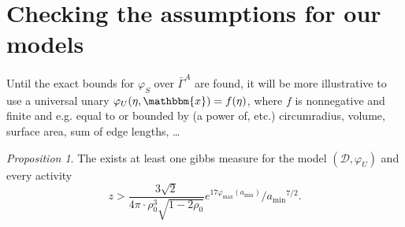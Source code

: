 \documentclass[12pt,a4paper]{article}
\theoremstyle{definition}
\theoremstyle{remark}
\theoremstyle{theorem}
\newtheorem{proposition}{Proposition}
\newcommand{\x}{\mathbbm{x}}
\begin{document}
\section{Checking the assumptions for our models}

 Until the exact bounds for $\varphi_S$ over $\bar\Gamma^A$ are found, it will be more illustrative to use a universal unary $\varphi_U(\eta,\x)=f(\eta)$, where $f$ is nonnegative and finite and e.g. equal to or bounded by (a power of, etc.) circumradius, volume, surface area, sum of edge lengths, \dots

\begin{proposition}
	The exists at least one gibbs measure for the model $(\mathcal D,\varphi_U)$ and every activity
	$$z > \frac{3\sqrt{2}}{4\pi \cdot \rho_0^3 \sqrt{1-2\rho_0}} e^{17 \varphi_{\text{max}}(a_{\text{min}})} / {a_{\text{min}}}^{7/2}.$$
\end{proposition}
\end{document}
